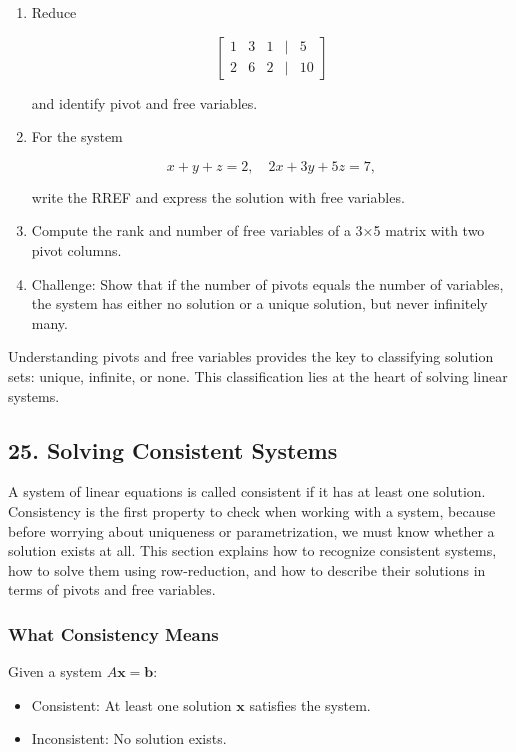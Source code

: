 \documentclass[
  letterpaper,
  DIV=11,
  numbers=noendperiod]{scrreprt}
\providecommand{\tightlist}{%
  \setlength{\itemsep}{0pt}\setlength{\parskip}{0pt}}
\begin{document}
\begin{enumerate}
\def\labelenumi{\arabic{enumi}.}
\item
  Reduce

  \[
  \begin{bmatrix}  
  1 & 3 & 1 & | & 5 \\  
  2 & 6 & 2 & | & 10  
  \end{bmatrix}
  \]

  and identify pivot and free variables.
\item
  For the system

  \[
  x + y + z = 2, \quad 2x + 3y + 5z = 7,
  \]

  write the RREF and express the solution with free variables.
\item
  Compute the rank and number of free variables of a 3×5 matrix with two
  pivot columns.
\item
  Challenge: Show that if the number of pivots equals the number of
  variables, the system has either no solution or a unique solution, but
  never infinitely many.
\end{enumerate}

Understanding pivots and free variables provides the key to classifying
solution sets: unique, infinite, or none. This classification lies at
the heart of solving linear systems.

\subsection{25. Solving Consistent
Systems}\label{solving-consistent-systems}

A system of linear equations is called consistent if it has at least one
solution. Consistency is the first property to check when working with a
system, because before worrying about uniqueness or parametrization, we
must know whether a solution exists at all. This section explains how to
recognize consistent systems, how to solve them using row-reduction, and
how to describe their solutions in terms of pivots and free variables.

\subsubsection{What Consistency Means}\label{what-consistency-means}

Given a system \(A\mathbf{x} = \mathbf{b}\):

\begin{itemize}
\tightlist
\item
  Consistent: At least one solution \(\mathbf{x}\) satisfies the system.
\item
  Inconsistent: No solution exists.
\end{itemize}
\end{document}
